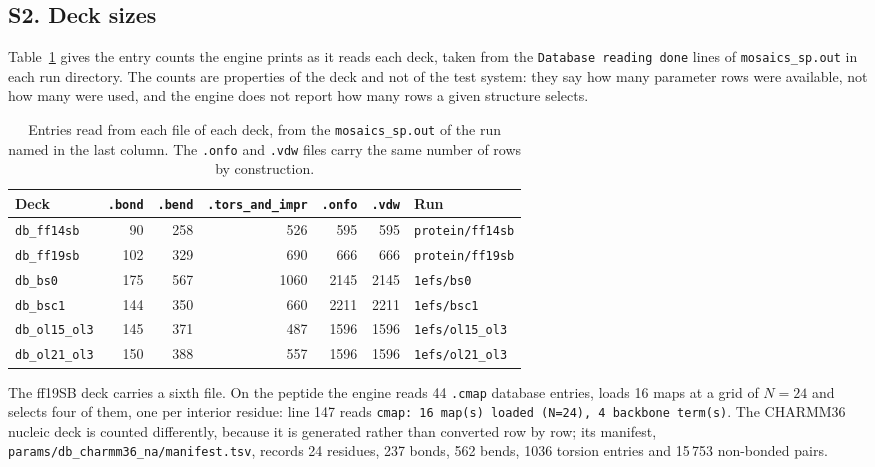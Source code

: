 \subsection*{S2. Deck sizes}

Table~\ref{tab:si-decks} gives the entry counts the engine prints as it
reads each deck, taken from the \texttt{Database reading done} lines of
\texttt{mosaics\_sp.out} in each run directory. The counts are properties
of the deck and not of the test system: they say how many parameter rows were
available, not how many were used, and the engine does not report how many rows
a given structure selects.

\begin{table}[h]
\centering
\footnotesize
\caption{Entries read from each file of each deck, from the
\texttt{mosaics\_sp.out} of the run named in the last column. The
\texttt{.onfo} and \texttt{.vdw} files carry the same number of rows by
construction.}
\label{tab:si-decks}
\begin{tabular}{lrrrrrl}
\toprule
Deck & \texttt{.bond} & \texttt{.bend} & \texttt{.tors\_and\_impr} & \texttt{.onfo} & \texttt{.vdw} & Run \\
\midrule
\texttt{db\_ff14sb}    &  90 & 258 &  526 &  595 &  595 & \texttt{protein/ff14sb} \\
\texttt{db\_ff19sb}    & 102 & 329 &  690 &  666 &  666 & \texttt{protein/ff19sb} \\
\texttt{db\_bs0}       & 175 & 567 & 1060 & 2145 & 2145 & \texttt{1efs/bs0} \\
\texttt{db\_bsc1}      & 144 & 350 &  660 & 2211 & 2211 & \texttt{1efs/bsc1} \\
\texttt{db\_ol15\_ol3} & 145 & 371 &  487 & 1596 & 1596 & \texttt{1efs/ol15\_ol3} \\
\texttt{db\_ol21\_ol3} & 150 & 388 &  557 & 1596 & 1596 & \texttt{1efs/ol21\_ol3} \\
\bottomrule
\end{tabular}
\end{table}

The ff19SB deck carries a sixth file. On the peptide the engine reads 44
\texttt{.cmap} database entries, loads 16 maps at a grid of $N=24$ and
selects four of them, one per interior residue:
 line 147 reads
\texttt{cmap: 16 map(s) loaded (N=24), 4 backbone term(s)}. The CHARMM36
nucleic deck is counted differently, because it is generated rather than
converted row by row; its manifest,
\texttt{params/db\_charmm36\_na/manifest.tsv}, records 24 residues, 237
bonds, 562 bends, 1036 torsion entries and 15\,753 non-bonded pairs.

